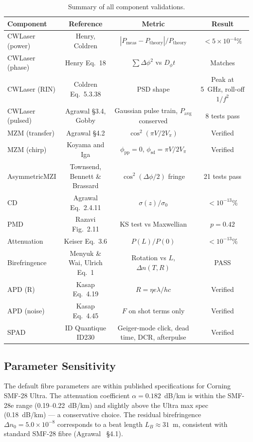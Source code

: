 \documentclass[11pt,a4paper]{article}
\begin{document}
\begin{table}[!ht]
  \caption{Summary of all component validations.}
  \label{tab:summary}
  \centering
  \begin{tabular}{l c c c}
    \toprule
    Component & Reference & Metric & Result \\
    \midrule
    CWLaser (power) & Henry, Coldren & $|P_{\text{meas}} - P_{\text{theory}}|/P_{\text{theory}}$ & $<5\times10^{-4}\%$ \\
    CWLaser (phase) & Henry Eq.~18 & $\sum\Delta\phi^2$ vs $D_\phi t$ & Matches \\
    CWLaser (RIN) & Coldren Eq.~5.3.38 & PSD shape & Peak at 5~GHz, roll-off $1/f^2$ \\
    CWLaser (pulsed) & Agrawal \S3.4, Gobby & Gaussian pulse train, $P_{\text{avg}}$ conserved & 8 tests pass \\
    MZM (transfer) & Agrawal \S4.2 & $\cos^2(\pi V/2V_\pi)$ & Verified \\
    MZM (chirp) & Koyama and Iga & $\phi_{\text{pp}}=0$, $\phi_{\text{sd}}=\pi V/2V_\pi$ & Verified \\
    AsymmetricMZI & Townsend, Bennett \& Brassard & $\cos^2(\Delta\phi/2)$ fringe & 21 tests pass \\
    CD & Agrawal Eq.~2.4.11 & $\sigma(z)/\sigma_0$ & $<10^{-13}\%$ \\
    PMD & Razavi Fig.~2.11 & KS test vs Maxwellian & $p = 0.42$ \\
    Attenuation & Keiser Eq.~3.6 & $P(L)/P(0)$ & $<10^{-13}\%$ \\
    Birefringence & Menyuk \& Wai, Ulrich Eq.~1 & Rotation vs $L$, $\Delta n(T,R)$ & PASS \\
    APD (R) & Kasap Eq.~4.19 & $R = \eta e\lambda/hc$ & Verified \\
    APD (noise) & Kasap Eq.~4.45 & $F$ on shot terms only & Verified \\
    SPAD & ID Quantique ID230 & Geiger-mode click, dead time, DCR, afterpulse & Verified \\
    \bottomrule
  \end{tabular}
\end{table}

\subsection{Parameter Sensitivity}

The default fibre parameters are within published specifications for
Corning SMF-28 Ultra.  The attenuation coefficient $\alpha = 0.182$~dB/km
is within the SMF-28e range (0.19--0.22~dB/km) and slightly above the
Ultra max spec (0.18~dB/km) --- a conservative choice.  The residual
birefringence $\Delta n_0 = 5.0\times10^{-8}$ corresponds to a beat
length $L_B \approx 31$~m, consistent with standard SMF-28 fibre
(Agrawal~\cite{agrawal5} \S4.1).
\end{document}
